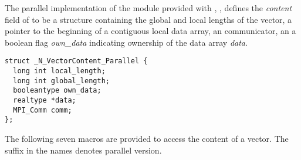 %
The parallel implementation of the {\nvector} module provided with {\sundials},
{\nvecp}, defines the {\em content} 
field of  to be a structure containing the global and local lengths 
of the vector, a pointer to the beginning of a contiguous local data array,
an {\mpi} communicator, an a boolean flag {\em own\_data} indicating ownership of 
the data array {\em data}.
\begin{verbatim} 
struct _N_VectorContent_Parallel {
  long int local_length;
  long int global_length;
  booleantype own_data;
  realtype *data;
  MPI_Comm comm;
};
\end{verbatim}
The following seven macros are provided to access the content of a {\nvecp}
vector. The suffix  in the names denotes parallel version.
